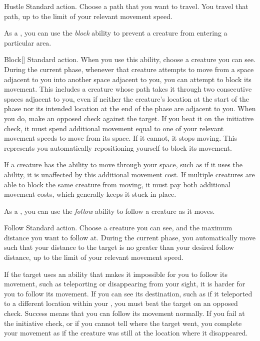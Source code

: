     \begin{activeability}{Hustle}
      \abilityusagetime Standard action.
      \rankline
      Choose a path that you want to travel.
      You travel that path, up to the limit of your relevant movement speed.
    \end{activeability}

     As a , you can use the \textit{block} ability to prevent a creature from entering a particular area.

    \begin{activeability}{Block}[]
      \abilityusagetime Standard action.
      \rankline
      When you use this ability, choose a creature you can see.
      During the current phase, whenever that creature attempts to move from a space adjacent to you into another space adjacent to you, you can attempt to block its movement.
      This includes a creature whose path takes it through two consecutive spaces adjacent to you, even if neither the creature's location at the start of the phase nor its intended location at the end of the phase are adjacent to you.
      When you do, make an opposed  check against the target.
      If you beat it on the initiative check, it must spend additional movement equal to one of your relevant movement speeds to move from its space.
      If it cannot, it stops moving.
      This represents you automatically repositioning yourself to block its movement.

      If a creature has the ability to move through your space, such as if it uses the  ability, it is unaffected by this additional movement cost.
      If multiple creatures are able to block the same creature from moving, it must pay both additional movement costs, which generally keeps it stuck in place.
    \end{activeability}

     As a , you can use the \textit{follow} ability to follow a creature as it moves.

    \begin{activeability}{Follow}
      \abilityusagetime Standard action.
      \rankline
      Choose a creature you can see, and the maximum distance you want to follow at.
      During the current phase, you automatically move such that your distance to the target is no greater than your desired follow distance, up to the limit of your relevant movement speed.

      If the target uses an ability that makes it impossible for you to follow its movement, such as teleporting or disappearing from your sight, it is harder for you to follow its movement.
      If you can see its destination, such as if it teleported to a different location within your , you must beat the target on an opposed  check.
      Success means that you can follow its movement normally.
      If you fail at the initiative check, or if you cannot tell where the target went, you complete your movement as if the creature was still at the location where it disappeared.
    \end{activeability}

